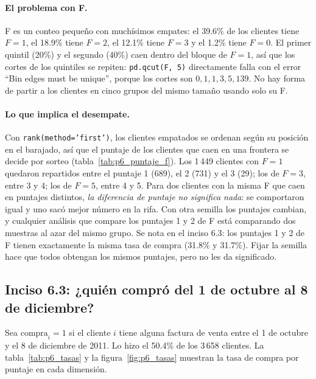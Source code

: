 \paragraph{El problema con F.} F es un conteo pequeño con muchísimos empates:
el 39.6\% de los clientes tiene $F=1$, el 18.9\% tiene $F=2$, el 12.1\% tiene
$F=3$ y el 1.2\% tiene $F=0$. El primer quintil (20\%) y el segundo (40\%)
caen dentro del bloque de $F=1$, así que los cortes de los quintiles se
repiten: \texttt{pd.qcut(F, 5)} directamente falla con el error ``Bin edges
must be unique'', porque los cortes son $0, 1, 1, 3, 5, 139$. No hay forma de
partir a los clientes en cinco grupos del mismo tamaño usando solo su F.

\begin{table}[H]
  \centering
  \small
  \caption{Número de clientes por valor de $F$ y puntaje asignado, para
  $F\leq6$. Los clientes con el mismo $F$ que aparecen en varias columnas
  recibieron su puntaje por sorteo.}
  \label{tab:p6_puntaje_f}
\end{table}

\paragraph{Lo que implica el desempate.} Con \texttt{rank(method='first')},
los clientes empatados se ordenan según su posición en el barajado, así que el
puntaje de los clientes que caen en una frontera se decide por sorteo
(tabla~\ref{tab:p6_puntaje_f}). Los 1\,449 clientes con $F=1$ quedaron
repartidos entre el puntaje 1 (689), el 2 (731) y el 3 (29); los de $F=3$,
entre 3 y 4; los de $F=5$, entre 4 y 5. Para dos clientes con la misma F que
caen en puntajes distintos, \emph{la diferencia de puntaje no significa nada}:
se comportaron igual y uno sacó mejor número en la rifa. Con otra semilla los
puntajes cambian, y cualquier análisis que compare los puntajes 1 y 2 de F
está comparando dos muestras al azar del mismo grupo. Se nota en el inciso
6.3: los puntajes 1 y 2 de F tienen exactamente la misma tasa de compra (31.8\%
y 31.7\%). Fijar la semilla hace que todos obtengan los mismos puntajes, pero
no les da significado.

\subsection{Inciso 6.3: ¿quién compró del 1 de octubre al 8 de diciembre?}

Sea $\text{compra}_i=1$ si el cliente $i$ tiene alguna factura de venta entre
el 1 de octubre y el 8 de diciembre de 2011. Lo hizo el 50.4\% de los 3\,658
clientes. La tabla~\ref{tab:p6_tasas} y la figura~\ref{fig:p6_tasas} muestran
la tasa de compra por puntaje en cada dimensión.

